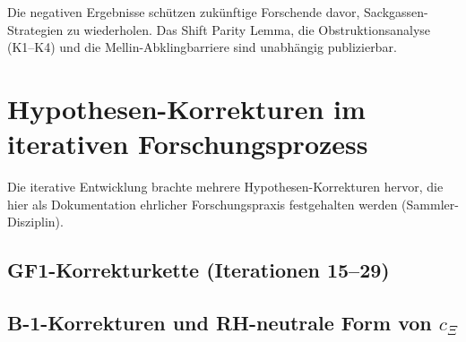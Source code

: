 \documentclass[12pt,a4paper]{article}
\theoremstyle{definition}
\theoremstyle{remark}
\begin{document}
\noindent Die negativen Ergebnisse schützen zukünftige Forschende davor,
Sackgassen-Strategien zu wiederholen. Das Shift Parity Lemma, die
Obstruktionsanalyse (K1--K4) und die Mellin-Abklingbarriere sind
unabhängig publizierbar.


\section{Hypothesen-Korrekturen im iterativen Forschungsprozess}
\label{sec:sammler-disziplin}

Die iterative Entwicklung brachte mehrere Hypothesen-Korrekturen hervor,
die hier als Dokumentation ehrlicher Forschungspraxis festgehalten werden
(Sammler-Disziplin).

\subsection{GF1-Korrekturkette (Iterationen 15--29)}

\begin{center}
\renewcommand{\arraystretch}{1.2}
\end{center}


\subsection{\texorpdfstring{B-1-Korrekturen und RH-neutrale Form von $c_\Xi$}{B-1-Korrekturen und RH-neutrale Form von cXi}}
\end{document}
